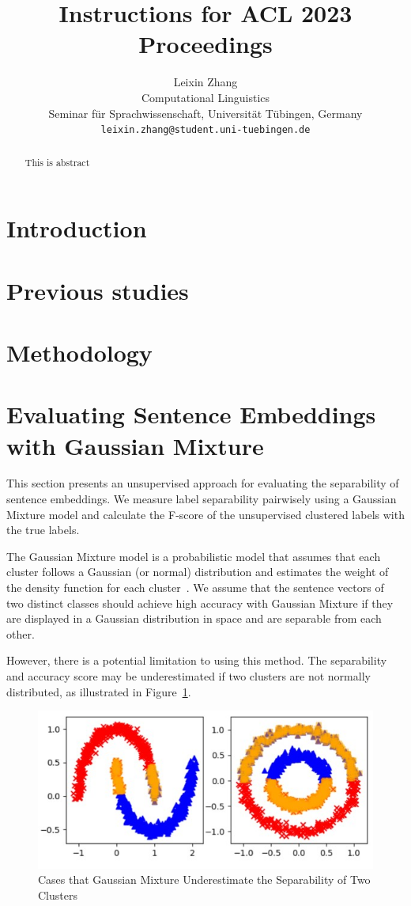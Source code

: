 \documentclass[11pt]{article}
\title{Instructions for ACL 2023 Proceedings}
\author{Leixin Zhang \\ 
    Computational Linguistics\\
    Seminar für Sprachwissenschaft,
    Universität Tübingen, Germany \\ 
    \texttt{leixin.zhang@student.uni-tuebingen.de}
    }%
\begin{document}
\maketitle
\begin{abstract}
This is abstract
\end{abstract}

\section{Introduction}


\section{Previous studies}

\section{Methodology}


\section{Evaluating Sentence Embeddings with Gaussian Mixture}

This section presents an unsupervised approach for evaluating the separability
of sentence embeddings. We measure label separability pairwisely using a
Gaussian Mixture model and calculate the F-score of the unsupervised clustered
labels with the true labels.

The Gaussian Mixture model is a probabilistic model that assumes that each
cluster follows a Gaussian (or normal) distribution and estimates the weight of
the density function for each cluster~\cite{reynolds2009gaussian,5298967}. We
assume that the sentence vectors of two distinct classes should achieve high
accuracy with Gaussian Mixture if they are displayed in a Gaussian distribution
in space and are separable from each other.

However, there is a potential limitation to using this method. The separability
and accuracy score may be underestimated if two clusters are not normally
distributed, as illustrated in Figure~\ref{fig:cirle}.


\begin{figure}[htp]
    \centering
    \includegraphics[scale=0.4]{figs/Circle.jpg}
    \caption{Cases that Gaussian Mixture Underestimate the Separability of Two
    Clusters}\label{fig:cirle}
\end{figure}
\end{document}
